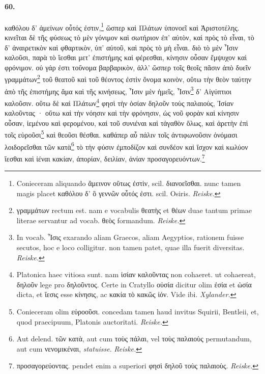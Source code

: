 \documentclass[a4paper, 11pt, oneside, polutonikogreek, german, landscape]{article}
\begin{document}
\paragraph{60.}
καθόλου δ' ἀμείνων οὗτός ἐστιν,\footnote{Conieceram aliquando ἂμεινον οὕτως ἐστὶν, scil. διανοεῖσθαι. nunc tamen magis placet καθόλου δ' ὃ γεννῶν οὗτός ἐστι. scil. Osiris. \emph{Reiske.} } ὥσπερ καὶ Πλάτων ὑπονοεῖ καὶ Ἀριστοτέλης. κινεῖται δὲ τῆς φύσεως τὸ μὲν γόνιμον καὶ σωτήριον ἐπ' αὐτὸν, καὶ πρὸς τὸ εἶναι, τὸ δ' ἀναιρετικὸν καὶ φθαρτικὸν, ὑπ' αὐτοῦ, καὶ πρὸς τὸ μὴ εἶναι. διὸ τὸ μὲν Ἶσιν καλοῦσι, παρὰ τὸ ἵεσθαι μετ' ἐπιστήμης καὶ φέρεσθαι, κίνησιν οὖσαν ἔμψυχον καὶ φρόνιμον. οὐ γάρ ἐστι τοὔνομα βαρβαρικὸν, ἀλλ' ὥσπερ τοῖς θεοῖς πᾶσιν ἀπὸ δυεῖν γραμμάτων\footnote{γραμμάτων rectum est. nam e vocabulis θεατὴς et θέων duae tantum primae literae servantur ad vocab. θεὸς formandum. \emph{Reiske.} } τοῦ θεατοῦ καὶ τοῦ θέοντος ἐστὶν ὄνομα κοινὸν, οὕτω τὴν θεὸν ταύτην ἀπὸ τῆς ἐπιστήμης ἅμα καὶ τῆς κινήσεως, Ἶσιν μὲν ἡμεῖς, Ἶσιν\footnote{In vocab. Ἶσις exarando aliam Graecos, aliam Aegyptios, rationem fuisse secutos, hoc e loco colligitur. non tamen patet, quae illa fuerit diversitas. \emph{Reiske.}} δ' Αἰγύπτιοι καλοῦσιν. οὕτω δὲ καὶ Πλάτων\footnote{Platonica haec vitiosa sunt. nam ἰσίαν καλοῦντας non cohaeret. ut cohaereat, δηλοῦν lege pro δηλοῦντος. Certe in Cratyllo οὐσία dicitur olim ἐσία et ὡσία dicta, et ἴεσις esse κίνησις, ac κακία τὸ κακῶς ἰόν. Vide ibi. \emph{Xylander.}} φησὶ τὴν ὁσίαν δηλοῦν τοὺς παλαιοὺς, Ἰσίαν καλοῦντας · οὕτω καὶ τὴν νόησιν καὶ τὴν φρόνησιν, ὡς νοῦ φορὰν καὶ κίνησιν οὖσαν, ἱεμένου καὶ φερομένου, καὶ τοῦ συνιέναι καὶ τἀγαθὸν ὅλως, καὶ ἀρετὴν ἐπὶ τοῖς εὑροῦσι\footnote{Conieceram olim εὐροοῦσι. concedam tamen haud invitus Squirii, Bentleii, et, quod praecipuum, Platonis auctoritati. \emph{Reiske.}} καὶ θεοῦσι θέσθαι. καθάπερ αὖ πάλιν τοῖς ἀντιφωνοῦσιν ὀνόμασι λοιδορεῖσθαι τῶν κατὰ\footnote{Aut delend. τῶν κατὰ, aut cum τοὺς πάλαι, vel τοὺς παλαιοὺς permutandum, aut cum νενομικέναι, \emph{statuisse}. \emph{Reiske.} } τὸ τὴν φύσιν ἐμποδίζον καὶ συνδέον καὶ ἴσχον καὶ κωλύον ἵεσθαι καὶ ἰέναι κακίαν, ἀπορίαν, δειλίαν, ἀνίαν προσαγορευόντων.\footnote{προσαγορεύοντας. pendet enim a superiori φησὶ δηλοῦ τοὺς παλαιοὺς. \emph{Reiske.}}
\end{document}
